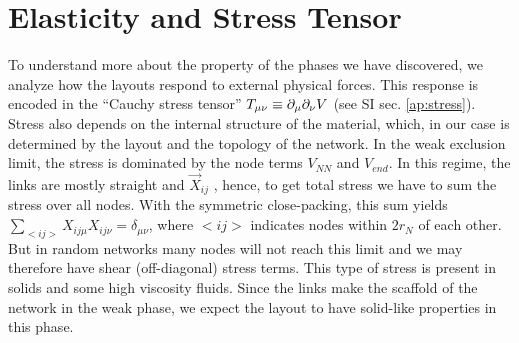 \documentclass[nofootinbib,preprint,floatfix,endfloats]{revtex4} %
\begin{document}
\section{Elasticity and Stress Tensor}
To understand more about the property of the phases we have discovered, we analyze how the layouts respond to external physical forces. This response is encoded in the ``Cauchy stress tensor'' $T_{\mu\nu} \equiv \partial_\mu\partial_\nu V$ \cite{irgens2008continuum} (see SI sec. \ref{ap:stress}).  
Stress also depends on the internal structure of the material, which, in our case is determined by the layout and the topology of the network. 
In the weak exclusion limit, the stress is dominated by the node terms $V_{NN}$ and $V_{end}$. 
In this regime, the links are mostly straight and $\vec{X}_{ij}$ %
, hence, to get total stress we have to %
sum the stress over all nodes.
With the symmetric close-packing, this sum yields $\sum_{<ij>} X_{ij\mu}X_{ij\nu} = \delta_{\mu\nu}$, where $<ij>$ indicates nodes within $2r_N$ of each other. 
But in random networks many nodes will not reach this limit and we may therefore have shear (off-diagonal) stress terms. This type of stress is present in solids and some high viscosity fluids. Since the links make the scaffold of the network in the weak phase, we expect the layout to have solid-like properties in this phase.  
\end{document}
